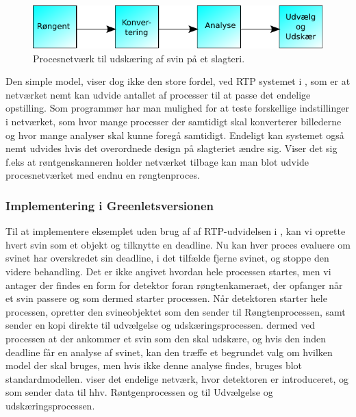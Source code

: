 \begin{figure}
 \begin{center}
  \includegraphics[scale=1]{images/pig-network}
	\caption{Procesnetværk til udskæring af svin på et slagteri.}
	\label{fig:pig-network}
\end{center}
\end{figure}

Den simple model, viser dog ikke den store fordel, ved RTP systemet i \pycsp, som er at netværket nemt kan udvide antallet af processer til at passe det endelige opstilling. Som programmør har man mulighed for at teste forskellige indstillinger i netværket, som hvor mange processer der samtidigt skal konverterer billederne og hvor mange analyser skal kunne foregå samtidigt. Endeligt kan systemet også nemt udvides hvis det overordnede design på slagteriet ændre sig. Viser det sig f.eks at røntgenskanneren holder netværket tilbage kan man blot udvide procesnetværket med endnu en røngtenproces.

\subsubsection*{Implementering i Greenletsversionen}
Til at implementere eksemplet uden brug af af RTP-udvidelsen i \pycsp, kan vi oprette hvert svin som et objekt og tilknytte en deadline. Nu kan hver proces evaluere om svinet har overskredet sin deadline, i det tilfælde fjerne svinet, og stoppe den videre behandling. Det er ikke angivet hvordan hele processen startes, men vi antager der findes en form for detektor foran røngtenkameraet, der opfanger når et svin passere og som dermed  starter processen. 
Når detektoren starter hele processen, opretter den svineobjektet som den sender til Røngtenprocessen, samt sender en kopi direkte til udvælgelse og udskæringsprocessen. dermed ved processen at der ankommer et svin som den skal udskære, og hvis den inden deadline får en analyse af svinet, kan den træffe et begrundet valg om hvilken model der skal bruges,  men hvis ikke denne analyse findes, bruges blot standardmodellen.  viser det endelige  netværk, hvor detektoren er introduceret, og som sender data til hhv. Røntgenprocessen og til Udvælgelse og udskæringsprocessen. 

